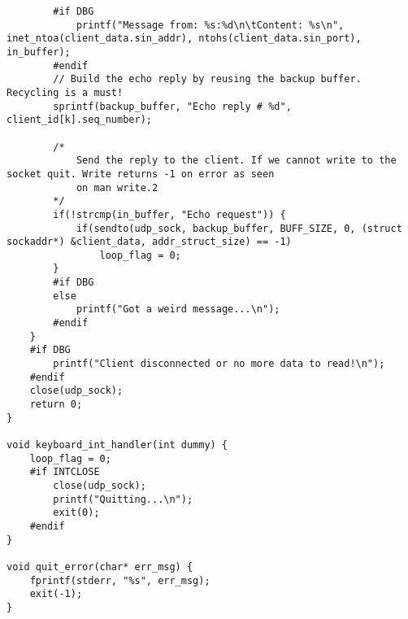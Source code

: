 \documentclass[landscape]{article}
\begin{document}
\begin{verbatim}
        #if DBG
            printf("Message from: %s:%d\n\tContent: %s\n", inet_ntoa(client_data.sin_addr), ntohs(client_data.sin_port), in_buffer);
        #endif
        // Build the echo reply by reusing the backup buffer. Recycling is a must!
        sprintf(backup_buffer, "Echo reply # %d", client_id[k].seq_number);
        
        /*
            Send the reply to the client. If we cannot write to the socket quit. Write returns -1 on error as seen
            on man write.2
        */
        if(!strcmp(in_buffer, "Echo request")) {
            if(sendto(udp_sock, backup_buffer, BUFF_SIZE, 0, (struct sockaddr*) &client_data, addr_struct_size) == -1)
                loop_flag = 0;
        }
        #if DBG
        else
            printf("Got a weird message...\n");
        #endif
    }
    #if DBG
        printf("Client disconnected or no more data to read!\n");
    #endif
    close(udp_sock);
    return 0;
}

void keyboard_int_handler(int dummy) {
    loop_flag = 0;
    #if INTCLOSE
        close(udp_sock);
        printf("Quitting...\n");
        exit(0);
    #endif
}

void quit_error(char* err_msg) {
    fprintf(stderr, "%s", err_msg);
    exit(-1);
}
                \end{verbatim}
\end{document}
